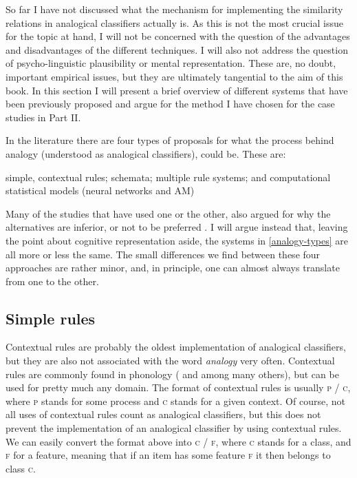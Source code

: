 So far I have not discussed what the mechanism for implementing the similarity relations in analogical classifiers actually is. As this is not the most crucial issue for the topic at hand, I will not be concerned with the question of the advantages and disadvantages of the different techniques. I will also not address the question of psycho-linguistic plausibility or mental representation. These are, no doubt, important empirical issues, but they are ultimately tangential to the aim of this book. In this section I will present a brief overview of different systems that have been previously proposed and argue for the method I have chosen for the case studies in Part II.

In the literature there are four types of proposals for what the process behind analogy (understood as analogical classifiers), could be. These are:

\begin{exe}
    \ex \label{analogy-types}
    \begin{xlist}
        \ex simple, contextual rules;
        \ex schemata;
        \ex multiple rule systems; and
        \ex computational statistical models (neural networks and AM)
    \end{xlist}
\end{exe}

Many of the studies that have used one or the other, also argued for why the alternatives are inferior, or not to be preferred \autocite{Albright.2003, Yaden.2003, Eddington.2000, Gouskova.2015}. I will argue instead that, leaving the point about cognitive representation aside, the systems in \ref{analogy-types} are all more or less the same. The small differences we find between these four approaches are rather minor, and, in principle, one can almost always translate from one to the other.

\subsection{Simple rules}


Contextual rules are probably the oldest implementation of analogical classifiers, but they are also not associated with the word \textit{analogy} very often. Contextual rules are commonly found in phonology (\cite{Chomsky.1968} and \cite{Goldsmith.2011} among many others), but can be used for pretty much any domain. The format of contextual rules is usually \textsc{p / c}, where \textsc{p} stands for some process and \textsc{c} stands for a given context. Of course, not all uses of contextual rules count as analogical classifiers, but this does not prevent the implementation of an analogical classifier by using contextual rules. We can easily convert the format above into \textsc{c / f}, where \textsc{c} stands for a class, and  \textsc{f} for a feature, meaning that if an item has some feature \textsc{f} it then belongs to class \textsc{c}.

